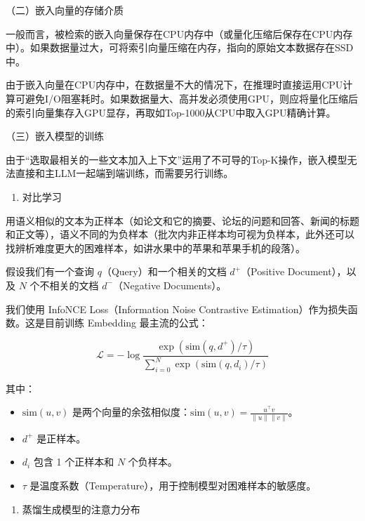 （二）嵌入向量的存储介质

一般而言，被检索的嵌入向量保存在CPU内存中（或量化压缩后保存在CPU内存中）。如果数据量过大，可将索引向量压缩在内存，指向的原始文本数据存在SSD中。

由于嵌入向量在CPU内存中，在数据量不大的情况下，在推理时直接运用CPU计算可避免I/O阻塞耗时。如果数据量大、高并发必须使用GPU，则应将量化压缩后的索引向量集存入GPU显存，再取如Top-1000从CPU中取入GPU精确计算。

（三）嵌入模型的训练

由于``选取最相关的一些文本加入上下文''运用了不可导的Top-K操作，嵌入模型无法直接和主LLM一起端到端训练，而需要另行训练。

\begin{enumerate}
\def\labelenumi{\arabic{enumi}.}
\tightlist
\item
  对比学习
\end{enumerate}

用语义相似的文本为正样本（如论文和它的摘要、论坛的问题和回答、新闻的标题和正文等），语义不同的为负样本（批次内非正样本均可视为负样本，此外还可以找辨析难度更大的困难样本，如讲水果中的苹果和苹果手机的段落）。

假设我们有一个查询 \(q\)（Query）和一个相关的文档 \(d^+\)（Positive Document），以及 \(N\) 个不相关的文档 \(d^-\)（Negative Documents）。

我们使用 InfoNCE Loss（Information Noise Contrastive Estimation）作为损失函数。这是目前训练 Embedding 最主流的公式：

\[
\mathcal{L}=-\log\frac{\exp(\mathrm{sim}(q,d^+)/\tau)}{\sum_{i=0}^{N}\exp(\mathrm{sim}(q,d_i)/\tau)}
\]

其中：

\begin{itemize}
\tightlist
\item
  \(\mathrm{sim}(u,v)\) 是两个向量的余弦相似度：\(\mathrm{sim}(u,v)=\frac{u^\top v}{\lVert u\rVert\lVert v\rVert}\)。
\item
  \(d^+\) 是正样本。
\item
  \(d_i\) 包含 1 个正样本和 \(N\) 个负样本。
\item
  \(\tau\) 是温度系数（Temperature），用于控制模型对困难样本的敏感度。
\end{itemize}

\begin{enumerate}
\def\labelenumi{\arabic{enumi}.}
\setcounter{enumi}{1}
\tightlist
\item
  蒸馏生成模型的注意力分布
\end{enumerate}

